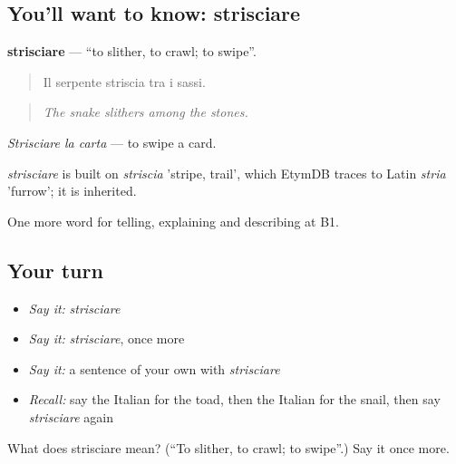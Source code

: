 \subsection*{You'll want to know: strisciare}
\textbf{strisciare} — \textquotedblleft{}to slither, to crawl; to swipe\textquotedblright{}.

\begin{quote}
Il serpente striscia tra i sassi.
\end{quote}

\begin{quote}
\emph{The snake slithers among the stones.}
\end{quote}

\emph{Strisciare la carta} — to swipe a card.

\begin{cousinweb}
\emph{strisciare} is built on \emph{striscia} 'stripe, trail', which EtymDB traces to Latin \emph{stria} 'furrow'; it is inherited.
\end{cousinweb}

\begin{grammarlens}[title={What you've built}]
One more word for telling, explaining and describing at B1.
\end{grammarlens}

\subsection*{Your turn}
\begin{itemize}
\raggedright
  \item \emph{Say it:} \emph{strisciare}
  \item \emph{Say it:} \emph{strisciare}, once more
  \item \emph{Say it:} a sentence of your own with \emph{strisciare}
  \item \emph{Recall:} say the Italian for the toad, then the Italian for the snail, then say \emph{strisciare} again
\end{itemize}

\begin{tcolorbox}[breakable,colback=teal!4,colframe=teal!35!black,title={Before you move on}]
What does strisciare mean? (\textquotedblleft{}To slither, to crawl; to swipe\textquotedblright{}.) Say it once more.
\end{tcolorbox}
